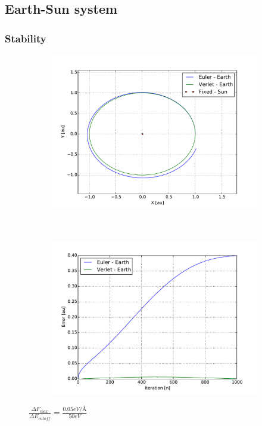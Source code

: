 \subsection{Earth-Sun system}

\subsubsection{Stability}

\begin{figure}[H]
    \centering
    \begin{subfigure}{0.5\textwidth}
        \centering
        \includegraphics[width=\linewidth]{result/bilder/earth-sun.pdf}
    \end{subfigure}%
    ~ 
    \begin{subfigure}{0.5\textwidth}
        \centering
        \includegraphics[width=\linewidth]{result/bilder/earth-sun-error.pdf}
    \end{subfigure}
    \caption{$\frac{\Delta F_{max} }{\Delta E_{cutoff}} = \frac{0.05eV/Å}{50eV}$}
\end{figure}


